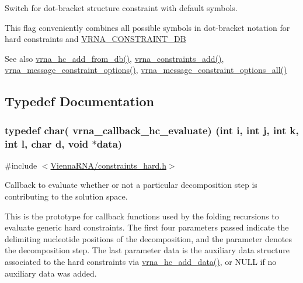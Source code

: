 Switch for dot-\/bracket structure constraint with default symbols. 

This flag conveniently combines all possible symbols in dot-\/bracket notation for hard constraints and \hyperlink{group__hard__constraints_ga4bfc2f15c4f261c62a11af9d2aa80c90}{V\+R\+N\+A\+\_\+\+C\+O\+N\+S\+T\+R\+A\+I\+N\+T\+\_\+\+DB}

\begin{DoxySeeAlso}{See also}
\hyperlink{group__hard__constraints_ga5b4de3247b67358080c176b94591a8e6}{vrna\+\_\+hc\+\_\+add\+\_\+from\+\_\+db()}, \hyperlink{group__constraints_ga35a401f680969a556858a8dd5f1d07cc}{vrna\+\_\+constraints\+\_\+add()}, \hyperlink{group__constraints_gaa1f20b53bf09ac2e6b0dbb13f7d89670}{vrna\+\_\+message\+\_\+constraint\+\_\+options()}, \hyperlink{group__constraints_gaec7e13fa0465c2acc7a621d1aecb709f}{vrna\+\_\+message\+\_\+constraint\+\_\+options\+\_\+all()} 
\end{DoxySeeAlso}


\subsection{Typedef Documentation}
\subsubsection[{\texorpdfstring{vrna\+\_\+callback\+\_\+hc\+\_\+evaluate}{vrna_callback_hc_evaluate}}]{\setlength{\rightskip}{0pt plus 5cm}typedef char( vrna\+\_\+callback\+\_\+hc\+\_\+evaluate) (int i, int j, int k, int l, char d, void $\ast$data)}\hypertarget{group__hard__constraints_ga16eb71ac9a7a35369be2eaa9d8f8dfa0}{}\label{group__hard__constraints_ga16eb71ac9a7a35369be2eaa9d8f8dfa0}


{\ttfamily \#include $<$\hyperlink{constraints__hard_8h}{Vienna\+R\+N\+A/constraints\+\_\+hard.\+h}$>$}



Callback to evaluate whether or not a particular decomposition step is contributing to the solution space. 

This is the prototype for callback functions used by the folding recursions to evaluate generic hard constraints. The first four parameters passed indicate the delimiting nucleotide positions of the decomposition, and the parameter {\ttfamily denotes} the decomposition step. The last parameter {\ttfamily data} is the auxiliary data structure associated to the hard constraints via \hyperlink{constraints__hard_8h_a128920e0af52e4196a9d59fa13336c7c}{vrna\+\_\+hc\+\_\+add\+\_\+data()}, or N\+U\+LL if no auxiliary data was added.

